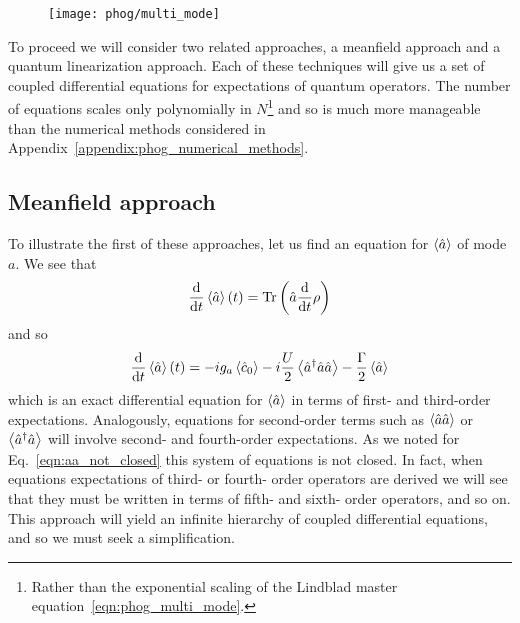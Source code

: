 \begin{figure}[htp]
\centering
\texttt{[image: phog/multi\_mode]}
\caption{\label{fig:phog_multi_mode} }
\end{figure}

To proceed we will consider two related approaches, a meanfield approach and a quantum linearization approach. Each of these techniques will give us a set of coupled differential equations for expectations of quantum operators. The number of equations scales only polynomially in $N$\footnote{Rather than the exponential scaling of the Lindblad master equation~\ref{eqn:phog_multi_mode}.} and so is much more manageable than the numerical methods considered in Appendix~\ref{appendix:phog_numerical_methods}.

\subsection{Meanfield approach}\label{sec:meanfield}
To illustrate the first of these approaches, let us find an equation for $\ev{\hat{a}}$ of mode $a$. We see that
\begin{equation}
\ddt \ev{\hat{a}}\left(t\right) = \text{Tr}\left( \hat{a} \ddt \rho\right)
\end{equation}
and so
\begin{equation}\label{eqn:phog_meanfield_deriv}
\ddt \ev{\hat{a}}\left(t\right) = - i g_a \ev{\hat{c}_0} - i \frac{U}{2} \ev{\hat{a}^\dagger \hat{a}\hat{a}} - \frac{\Gamma}{2} \ev{\hat{a}}
\end{equation}
which is an exact differential equation for $\ev{\hat{a}}$ in terms of first- and third-order expectations. Analogously, equations for second-order terms such as $\ev{\hat{a}\hat{a}}$ or $\ev{\hat{a}^\dagger \hat{a}}$ will involve second- and fourth-order expectations. As we noted for Eq.~\ref{eqn:aa_not_closed} this system of equations is not closed. In fact, when equations expectations of third- or fourth- order operators are derived we will see that they must be written in terms of fifth- and sixth- order operators, and so on. This approach will yield an infinite hierarchy of coupled differential equations, and so we must seek a simplification.

